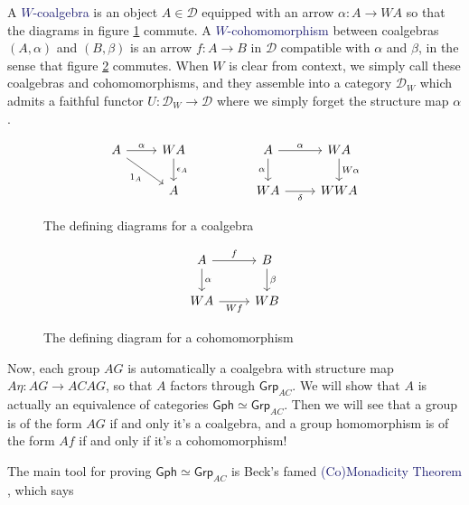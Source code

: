 \documentclass[12pt]{article}
\theoremstyle{definition}
\theoremstyle{theorem}
\newcommand*{\catFont}[1]{\mathsf{#1}}
\newcommand*{\catVarFont}[1]{\mathcal{#1}}
\newcommand{\Grp}{\catFont{Grp}}
\newcommand{\catD}{\catVarFont{D}}
\newcommand*{\important}[1]{\textcolor{MidnightBlue}{#1}}
\begin{document}
A \important{$W$-coalgebra} is an object
$A \in \catD$ equipped with an arrow $\alpha : A \to WA$ so that the
diagrams in figure \ref{coalg} commute. A \important{$W$-cohomomorphism}
between coalgebras $(A,\alpha)$ and $(B,\beta)$ is an arrow $f : A \to B$
in $\mathcal{D}$ compatible with $\alpha$ and $\beta$, in the sense that 
figure \ref{cohom} commutes. When $W$ is clear from context, we simply call these
coalgebras and cohomomorphisms, and they assemble into a category $\catD_W$
which admits a faithful functor $U : \catD_W \to \catD$ where we 
simply forget the structure map $\alpha$.

\begin{figure}
    \caption{The defining diagrams for a coalgebra}
    \label{coalg}
    \[
        \begin{tikzcd}
        A & WA && A & WA \\
        & A && WA & WWA
        \arrow["\alpha", from=1-1, to=1-2]
        \arrow["{\epsilon_A}", from=1-2, to=2-2]
        \arrow["{1_A}"', from=1-1, to=2-2]
        \arrow["\alpha"', from=1-4, to=2-4]
        \arrow["\alpha", from=1-4, to=1-5]
        \arrow["\delta"', from=2-4, to=2-5]
        \arrow["W\alpha", from=1-5, to=2-5]
        \end{tikzcd}
    \]
\end{figure}

\begin{figure}
    \caption{The defining diagram for a cohomomorphism}
    \label{cohom}
    \[
        \begin{tikzcd}
        A & B \\
        WA & WB
        \arrow["\alpha", from=1-1, to=2-1]
        \arrow["\beta", from=1-2, to=2-2]
        \arrow["f", from=1-1, to=1-2]
        \arrow["Wf"', from=2-1, to=2-2]
        \end{tikzcd}
    \]    
\end{figure}

Now, each group $AG$ is automatically a coalgebra with structure map
$A \eta : AG \to ACAG$, so that $A$ factors through $\Grp_{AC}$.
We will show that $A$ is actually an equivalence of categories 
$\mathsf{Gph} \simeq \Grp_{AC}$. Then we will see that a group is of the
form $AG$ if and only it's a coalgebra, and a group homomorphism is of the
form $Af$ if and only if it's a cohomomorphism!

The main tool for proving $\mathsf{Gph} \simeq \Grp_{AC}$ is Beck's famed
\important{(Co)Monadicity Theorem} , which says
\end{document}
